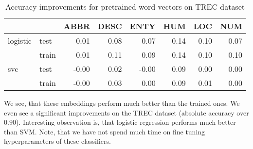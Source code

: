     \begin{table}[H]
    \begin{center}
    
    \begin{tabular}{llrrrrrr}
    \toprule
     &&ABBR &DESC &ENTY &HUM &LOC &NUM \\
    \midrule
    logistic & test &0.01 &0.08 &0.07 & 0.14 & 0.10 & 0.07 \\
     & train &0.01 &0.11 &0.09 & 0.14 & 0.10 & 0.10 \\
    svc & test & -0.00 &0.02 & -0.00 & 0.09 & 0.00 & 0.00 \\
     & train & -0.00 &0.03 &0.00 & 0.09 & 0.01 & 0.00 \\
    \bottomrule
    \end{tabular}
    
    \caption[Accuracy improvements for pretrained word vectors on TREC dataset]{Accuracy improvements for pretrained word vectors on TREC dataset}
    \label{tab:res:pretrainedwordvec:trec}
    \end{center}
    \end{table}

    
    We see, that these embeddings perform much better than the trained ones. 
    We even see a significant improvements on the TREC dataset (absolute accuracy over $0.90$).
    Interesting observation is, that logistic regression performs much better than SVM.
    Note, that we have not spend much time on fine tuning hyperparameters of these classifiers. 

    
    {}